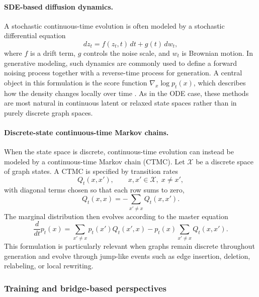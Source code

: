 \documentclass{article}
\begin{document}
\paragraph{SDE-based diffusion dynamics.}
A stochastic continuous-time evolution is often modeled by a stochastic differential equation
\begin{equation}
d z_t = f(z_t,t)\, dt + g(t)\, d w_t,
\label{eq:prelim_sde}
\end{equation}
where $f$ is a drift term, $g$ controls the noise scale, and $w_t$ is Brownian motion. In generative modeling, such dynamics are commonly used to define a forward noising process together with a reverse-time process for generation. A central object in this formulation is the score function $\nabla_x \log p_t(x)$, which describes how the density changes locally over time \cite{song2021sde,ho2020denoising,song2020ddim}. As in the ODE case, these methods are most natural in continuous latent or relaxed state spaces rather than in purely discrete graph spaces.

\paragraph{Discrete-state continuous-time Markov chains.}
When the state space is discrete, continuous-time evolution can instead be modeled by a continuous-time Markov chain (CTMC). Let $\mathcal{X}$ be a discrete space of graph states. A CTMC is specified by transition rates
\begin{equation}
Q_t(x,x'), \qquad x,x' \in \mathcal{X}, \; x \neq x',
\label{eq:prelim_ctmc_rates}
\end{equation}
with diagonal terms chosen so that each row sums to zero,
\begin{equation}
Q_t(x,x) = - \sum_{x' \neq x} Q_t(x,x').
\label{eq:prelim_ctmc_diag}
\end{equation}
The marginal distribution then evolves according to the master equation
\begin{equation}
\frac{d}{dt} p_t(x) = \sum_{x' \neq x} p_t(x') Q_t(x',x) - p_t(x)\sum_{x' \neq x} Q_t(x,x').
\label{eq:prelim_master_equation}
\end{equation}
This formulation is particularly relevant when graphs remain discrete throughout generation and evolve through jump-like events such as edge insertion, deletion, relabeling, or local rewriting.

\subsubsection{Training and bridge-based perspectives}
\end{document}
